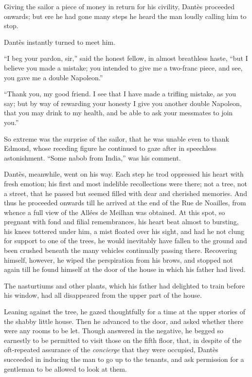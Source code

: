 Giving the sailor a piece of money in return for his civility, Dantès
proceeded onwards; but ere he had gone many steps he heard the man
loudly calling him to stop.

Dantès instantly turned to meet him.

“I beg your pardon, sir,” said the honest fellow, in almost breathless
haste, “but I believe you made a mistake; you intended to give me a
two-franc piece, and see, you gave me a double Napoleon.”

“Thank you, my good friend. I see that I have made a trifling mistake,
as you say; but by way of rewarding your honesty I give you another
double Napoleon, that you may drink to my health, and be able to ask
your messmates to join you.”

So extreme was the surprise of the sailor, that he was unable even to
thank Edmond, whose receding figure he continued to gaze after in
speechless astonishment. “Some nabob from India,” was his comment.

Dantès, meanwhile, went on his way. Each step he trod oppressed his
heart with fresh emotion; his first and most indelible recollections
were there; not a tree, not a street, that he passed but seemed filled
with dear and cherished memories. And thus he proceeded onwards till he
arrived at the end of the Rue de Noailles, from whence a full view of
the Allées de Meilhan was obtained. At this spot, so pregnant with fond
and filial remembrances, his heart beat almost to bursting, his knees
tottered under him, a mist floated over his sight, and had he not clung
for support to one of the trees, he would inevitably have fallen to the
ground and been crushed beneath the many vehicles continually passing
there. Recovering himself, however, he wiped the perspiration from his
brows, and stopped not again till he found himself at the door of the
house in which his father had lived.

The nasturtiums and other plants, which his father had delighted to
train before his window, had all disappeared from the upper part of the
house.

Leaning against the tree, he gazed thoughtfully for a time at the upper
stories of the shabby little house. Then he advanced to the door, and
asked whether there were any rooms to be let. Though answered in the
negative, he begged so earnestly to be permitted to visit those on the
fifth floor, that, in despite of the oft-repeated assurance of the
\textit{concierge} that they were occupied, Dantès succeeded in inducing the
man to go up to the tenants, and ask permission for a gentleman to be
allowed to look at them.

